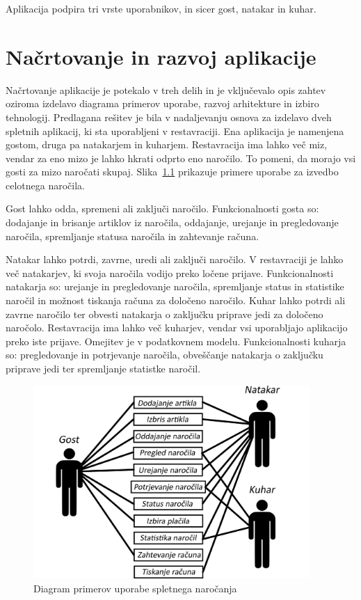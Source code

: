 \documentclass[a4paper, 12pt]{book}
\begin{document}
Aplikacija podpira tri vrste uporabnikov, in sicer gost, natakar in kuhar. 


\chapter{Načrtovanje in razvoj aplikacije}

Načrtovanje aplikacije je potekalo v treh delih in je vključevalo opis zahtev oziroma izdelavo diagrama primerov uporabe, razvoj arhitekture in izbiro tehnologij. 
Predlagana rešitev je bila v nadaljevanju osnova za izdelavo dveh spletnih aplikacij, ki sta uporabljeni v restavraciji. Ena aplikacija je namenjena gostom, druga pa natakarjem in kuharjem. Restavracija ima lahko več miz, vendar za eno mizo je lahko hkrati odprto eno naročilo. To pomeni, da morajo vsi gosti za mizo naročati skupaj. Slika~\ref{FunkVloge} prikazuje primere uporabe za izvedbo celotnega naročila. 

Gost lahko odda, spremeni ali zaključi naročilo. Funkcionalnosti gosta so: dodajanje in brisanje artiklov iz naročila, oddajanje, urejanje in pregledovanje naročila, spremljanje statusa naročila in zahtevanje računa. 

Natakar lahko potrdi, zavrne, uredi ali zaključi naročilo. V restavraciji je lahko več natakarjev, ki svoja naročila vodijo preko ločene prijave. Funkcionalnosti natakarja so: urejanje in pregledovanje naročila, spremljanje status in statistike naročil in možnost tiskanja računa za določeno naročilo. Kuhar lahko potrdi ali zavrne naročilo ter obvesti natakarja o zaključku priprave jedi za določeno naročolo. Restavracija ima lahko več kuharjev, vendar vsi uporabljajo aplikacijo preko iste prijave. Omejitev je v podatkovnem modelu. Funkcionalnosti kuharja so: pregledovanje in potrjevanje naročila, obveščanje natakarja o zaključku priprave jedi ter spremljanje statistke naročil. 

\begin{figure}[!htb]
\begin{center}
\includegraphics[width=10.5cm]{Skica2.png}
\caption{Diagram primerov uporabe spletnega naročanja}
\label{FunkVloge}
\end{center}
\end{figure}
\end{document}
